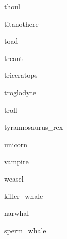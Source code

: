 \documentclass[letterpaper,serif]{module}
\begin{document}
\begin{newmonster}{thoul}\end{newmonster}

\begin{newmonster}{titanothere}\end{newmonster}

\begin{newmonster}{toad}\end{newmonster}

\begin{newmonster}{treant}\end{newmonster}

\begin{newmonster}{triceratops}\end{newmonster}

\begin{newmonster}{troglodyte}\end{newmonster}

\begin{newmonster}{troll}\end{newmonster}

\begin{newmonster}{tyrannosaurus_rex}\end{newmonster}

\begin{newmonster}{unicorn}\end{newmonster}

\begin{newmonster}{vampire}\end{newmonster}

\begin{newmonster}{weasel}\end{newmonster}

\begin{newmonster}{killer_whale}\end{newmonster}

\begin{newmonster}{narwhal}\end{newmonster}

\begin{newmonster}{sperm_whale}\end{newmonster}
\end{document}
